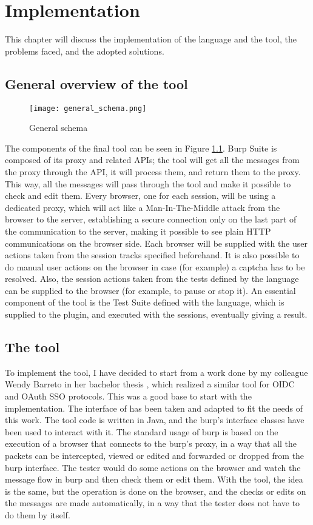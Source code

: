 \chapter{Implementation}
\label{chap:Implementation}
This chapter will discuss the implementation of the language and the tool, the problems faced, and the adopted solutions.

\section{General overview of the tool}
\begin{figure}
    \texttt{[image: general\_schema.png]}
    \caption{General schema}
    \label{fig:general_schema}
\end{figure}

The components of the final tool can be seen in Figure \ref{fig:general_schema}. Burp Suite is composed of its proxy and related APIs; the tool will get all the messages from the proxy through the API, it will process them, and return them to the proxy. This way, all the messages will pass through the tool and make it possible to check and edit them.
Every browser, one for each session, will be using a dedicated proxy, which will act like a Man-In-The-Middle attack from the browser to the server, establishing a secure connection only on the last part of the communication to the server, making it possible to see plain HTTP communications on the browser side. Each browser will be supplied with the user actions taken from the session tracks specified beforehand. It is also possible to do manual user actions on the browser in case (for example) a captcha has to be resolved. Also, the session actions taken from the tests defined by the language can be supplied to the browser (for example, to pause or stop it). An essential component of the tool is the Test Suite defined with the language, which is supplied to the plugin, and executed with the sessions, eventually giving a result.

\section{The tool}
To implement the tool, I have decided to start from a work done by my colleague Wendy Barreto in her bachelor thesis \cite{wendy_barreto}, which realized a similar tool for \gls{OIDC} and \gls{OAuth} SSO protocols. This was a good base to start with the implementation. The interface of \cite{wendy_barreto} has been taken and adapted to fit the needs of this work. The tool code is written in Java, and the \Gls{burp}'s interface classes have been used to interact with it.
The standard usage of \Gls{burp} is based on the execution of a browser that connects to the \Gls{burp}'s proxy, in a way that all the packets can be intercepted, viewed or edited and forwarded or dropped from the \Gls{burp} interface. The tester would do some actions on the browser and watch the message flow in \Gls{burp} and then check them or edit them. With the tool, the idea is the same, but the operation is done on the browser, and the checks or edits on the messages are made automatically, in a way that the tester does not have to do them by itself.

